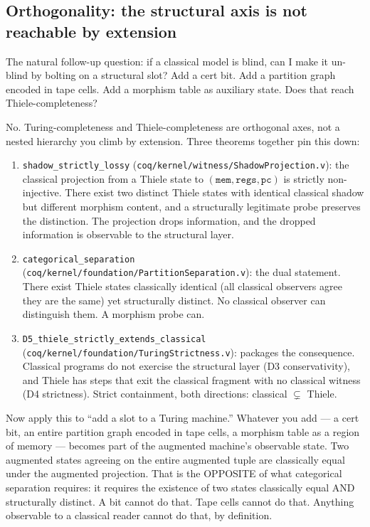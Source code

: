 \documentclass[11pt,a4paper]{article}
\theoremstyle{plain}
\theoremstyle{definition}
\theoremstyle{remark}
\begin{document}
\subsection{Orthogonality: the structural axis is not reachable by extension}

The natural follow-up question: if a classical model is blind, can I make it un-blind by bolting on a structural slot? Add a cert bit. Add a partition graph encoded in tape cells. Add a morphism table as auxiliary state. Does that reach Thiele-completeness?

No. Turing-completeness and Thiele-completeness are orthogonal axes, not a nested hierarchy you climb by extension. Three theorems together pin this down:

\begin{enumerate}
\item \texttt{shadow\_strictly\_lossy} (\texttt{coq/kernel/witness/ShadowProjection.v}): the classical projection from a Thiele state to $(\texttt{mem}, \texttt{regs}, \texttt{pc})$ is strictly non-injective. There exist two distinct Thiele states with identical classical shadow but different morphism content, and a structurally legitimate probe preserves the distinction. The projection drops information, and the dropped information is observable to the structural layer.
\item \texttt{categorical\_separation} (\texttt{coq/kernel/foundation/PartitionSeparation.v}): the dual statement. There exist Thiele states classically identical (all classical observers agree they are the same) yet structurally distinct. No classical observer can distinguish them. A morphism probe can.
\item \texttt{D5\_thiele\_strictly\_extends\_classical} (\texttt{coq/kernel/foundation/TuringStrictness.v}): packages the consequence. Classical programs do not exercise the structural layer (D3 conservativity), and Thiele has steps that exit the classical fragment with no classical witness (D4 strictness). Strict containment, both directions: classical $\subsetneq$ Thiele.
\end{enumerate}

Now apply this to ``add a slot to a Turing machine.'' Whatever you add --- a cert bit, an entire partition graph encoded in tape cells, a morphism table as a region of memory --- becomes part of the augmented machine's observable state. Two augmented states agreeing on the entire augmented tuple are classically equal under the augmented projection. That is the OPPOSITE of what categorical separation requires: it requires the existence of two states classically equal AND structurally distinct. A bit cannot do that. Tape cells cannot do that. Anything observable to a classical reader cannot do that, by definition.
\end{document}

